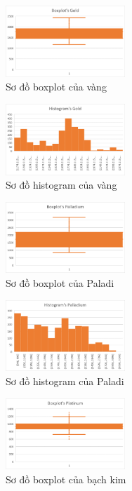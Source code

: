 \begin{figure}[htbp]
\centerline{\includegraphics[width=0.4\textwidth]{img/Picture2.png}}
\caption{Sơ đồ boxplot của vàng}
\label{fig}
\end{figure}

\begin{figure}[htbp]
\centerline{\includegraphics[width=0.4\textwidth]{img/Picture5.png}}
\caption{Sơ đồ histogram của vàng}
\label{fig}
\end{figure}

\begin{figure}[htbp]
\centerline{\includegraphics[width=0.4\textwidth]{img/Picture3.png}}
\caption{Sơ đồ boxplot của Paladi}
\label{fig}
\end{figure}

\begin{figure}[htbp]
\centerline{\includegraphics[width=0.4\textwidth]{img/Picture6.png}}
\caption{Sơ đồ histogram của Paladi}
\label{fig}
\end{figure}

\begin{figure}[htbp]
\centerline{\includegraphics[width=0.4\textwidth]{img/Picture4.png}}
\caption{Sơ đồ boxplot của bạch kim}
\label{fig}
\end{figure}

